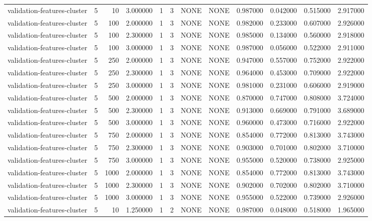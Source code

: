 \begin{tabular}{lrrrllllrrrr}
validation-features-cluster & 5 & 10 & 3.000000 & 1 & 3 & NONE & NONE & 0.987000 & 0.042000 & 0.515000 & 2.917000 \\
validation-features-cluster & 5 & 100 & 2.000000 & 1 & 3 & NONE & NONE & 0.982000 & 0.233000 & 0.607000 & 2.926000 \\
validation-features-cluster & 5 & 100 & 2.300000 & 1 & 3 & NONE & NONE & 0.985000 & 0.134000 & 0.560000 & 2.918000 \\
validation-features-cluster & 5 & 100 & 3.000000 & 1 & 3 & NONE & NONE & 0.987000 & 0.056000 & 0.522000 & 2.911000 \\
validation-features-cluster & 5 & 250 & 2.000000 & 1 & 3 & NONE & NONE & 0.947000 & 0.557000 & 0.752000 & 2.922000 \\
validation-features-cluster & 5 & 250 & 2.300000 & 1 & 3 & NONE & NONE & 0.964000 & 0.453000 & 0.709000 & 2.922000 \\
validation-features-cluster & 5 & 250 & 3.000000 & 1 & 3 & NONE & NONE & 0.981000 & 0.231000 & 0.606000 & 2.919000 \\
validation-features-cluster & 5 & 500 & 2.000000 & 1 & 3 & NONE & NONE & 0.870000 & 0.747000 & 0.808000 & 3.724000 \\
validation-features-cluster & 5 & 500 & 2.300000 & 1 & 3 & NONE & NONE & 0.913000 & 0.669000 & 0.791000 & 3.689000 \\
validation-features-cluster & 5 & 500 & 3.000000 & 1 & 3 & NONE & NONE & 0.960000 & 0.473000 & 0.716000 & 2.922000 \\
validation-features-cluster & 5 & 750 & 2.000000 & 1 & 3 & NONE & NONE & 0.854000 & 0.772000 & 0.813000 & 3.743000 \\
validation-features-cluster & 5 & 750 & 2.300000 & 1 & 3 & NONE & NONE & 0.903000 & 0.701000 & 0.802000 & 3.710000 \\
validation-features-cluster & 5 & 750 & 3.000000 & 1 & 3 & NONE & NONE & 0.955000 & 0.520000 & 0.738000 & 2.925000 \\
validation-features-cluster & 5 & 1000 & 2.000000 & 1 & 3 & NONE & NONE & 0.854000 & 0.772000 & 0.813000 & 3.743000 \\
validation-features-cluster & 5 & 1000 & 2.300000 & 1 & 3 & NONE & NONE & 0.902000 & 0.702000 & 0.802000 & 3.710000 \\
validation-features-cluster & 5 & 1000 & 3.000000 & 1 & 3 & NONE & NONE & 0.955000 & 0.522000 & 0.739000 & 2.926000 \\
validation-features-cluster & 5 & 10 & 1.250000 & 1 & 2 & NONE & NONE & 0.987000 & 0.048000 & 0.518000 & 1.965000 \\

\end{tabular}
